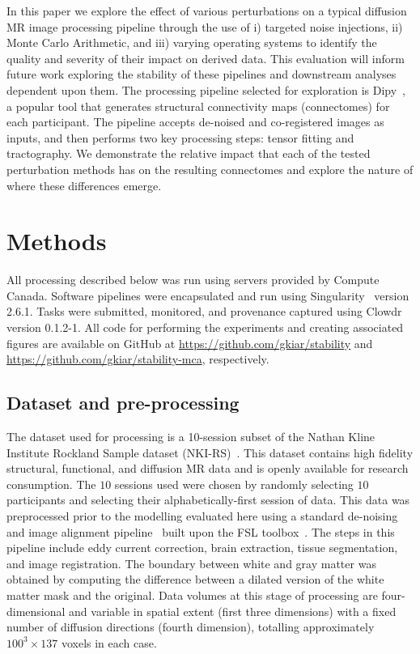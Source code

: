 \documentclass[fleqn,12pt]{SelfArx_ch} %
\begin{document}
In this paper we explore the effect of various perturbations on a typical diffusion MR image processing pipeline
through the use of i) targeted noise injections, ii) Monte Carlo Arithmetic, and iii) varying operating systems to
identify the quality and severity of their impact on derived data. This evaluation will inform future work exploring
the stability of these pipelines and downstream analyses dependent upon them. The processing pipeline selected for
exploration is Dipy~\cite{Garyfallidis2014-ql}, a popular tool that generates structural connectivity maps
(connectomes) for each participant. The pipeline accepts de-noised and co-registered images as inputs, and then
performs two key processing steps: tensor fitting and tractography. We demonstrate the relative impact that each of the
tested perturbation methods has on the resulting connectomes and explore the nature of where these differences emerge.

\section{Methods}
All processing described below was run using servers provided by Compute Canada. Software pipelines were encapsulated
and run using Singularity~\cite{Kurtzer2017-kq} version 2.6.1. Tasks were submitted, monitored, and provenance captured
using Clowdr~\cite{kiar2019-clowdr} version 0.1.2-1. All code for performing the experiments and creating associated
figures are available on GitHub at \href{https://github.com/gkiar/stability}{https://github.com/gkiar/stability} and
\href{https://github.com/gkiar/stability-mca}{https://github.com/gkiar/stability-mca}, respectively.

\subsection{Dataset and pre-processing}
The dataset used for processing is a 10-session subset of the Nathan Kline Institute Rockland Sample dataset
(NKI-RS)~\cite{Nooner2012-eg}. This dataset contains high fidelity structural, functional, and diffusion MR data and is
openly available for research consumption. The $10$ sessions used were chosen by randomly selecting $10$ participants
and selecting their alphabetically-first session of data. This data was preprocessed prior to the modelling evaluated
here using a standard de-noising and image alignment pipeline~\cite{Greg_Kiar2019-ds} built upon the FSL
toolbox~\cite{Jenkinson2012-ly}. The steps in this pipeline include eddy current correction, brain extraction, tissue
segmentation, and image registration. The boundary between white and gray matter was obtained by computing the
difference between a dilated version of the white matter mask and the original. Data volumes at this stage of
processing are four-dimensional and variable in spatial extent (first three dimensions) with a fixed number of
diffusion directions (fourth dimension), totalling approximately $100^3 \times 137$ voxels in each case.
\end{document}
